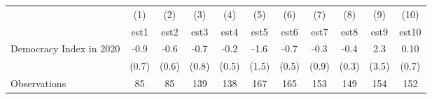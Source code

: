 {
\def\sym#1{\ifmmode^{#1}\else\(^{#1}\)\fi}
\begin{tabular}{l*{10}{c}}
                    &\multicolumn{1}{c}{(1)}         &\multicolumn{1}{c}{(2)}         &\multicolumn{1}{c}{(3)}         &\multicolumn{1}{c}{(4)}         &\multicolumn{1}{c}{(5)}         &\multicolumn{1}{c}{(6)}         &\multicolumn{1}{c}{(7)}         &\multicolumn{1}{c}{(8)}         &\multicolumn{1}{c}{(9)}         &\multicolumn{1}{c}{(10)}         \\
                    &        est1         &        est2         &        est3         &        est4         &        est5         &        est6         &        est7         &        est8         &        est9         &       est10         \\
Democracy Index in 2020&        -0.9         &        -0.6         &        -0.7         &        -0.2         &        -1.6         &        -0.7         &        -0.3         &        -0.4         &         2.3         &        0.10         \\
                    &       (0.7)         &       (0.6)         &       (0.8)         &       (0.5)         &       (1.5)         &       (0.5)         &       (0.9)         &       (0.3)         &       (3.5)         &       (0.7)         \\
Observations        &          85         &          85         &         139         &         138         &         167         &         165         &         153         &         149         &         154         &         152         \\
\end{tabular}
}
